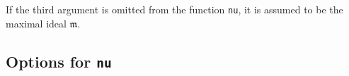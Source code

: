 \documentclass{amsart}
\newcommand{\idealm}{\mathfrak{m}}
\newcommand{\pedro}[2][] 
{\todo[linecolor=blue,backgroundcolor=blue!10,caption={}, #1]{#2}}
\begin{document}








If the third argument is omitted from the function \texttt{nu}, it is assumed to be the maximal ideal $\idealm$.








\subsection{Options for \texttt{nu}}
\end{document}
